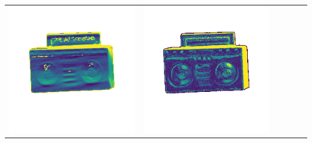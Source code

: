 \begin{tabularx}{\linewidth}{@{}Y@{}Y@{}Y@{}Y@{}Y@{}Y@{}}
\includegraphics[width=\linewidth]{semisynthetic/20150514_19_yu_err.png} &
\includegraphics[width=\linewidth]{semisynthetic/20150514_19_dpsn_err.png} &

\end{tabularx}
